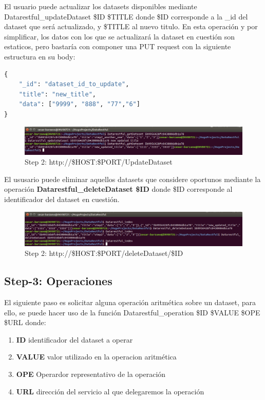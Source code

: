 \documentclass[a4paper,11pt]{book}
\begin{document}
El usuario puede actualizar los datasets disponibles mediante Datarestful\_updateDataset \$ID \$TITLE donde \$ID  corresponde a la \_id del dataset que será actualizado, y \$TITLE al nuevo titulo. En esta operación y por simplificar, los datos con los que se actualizará la dataset en cuestión son estaticos, pero bastaría con componer una PUT request con la siguiente estructura en su body:  

\begin{lstlisting}[language=python,caption={body}]
{
	"_id": "dataset_id_to_update",
    "title": "new_title",
    "data": ["9999", "888", "77","6"]
}

\end{lstlisting}

\begin{figure}[H]  
\centering 
\includegraphics[scale=0.35]{imagenes/update.png}
\caption{ Step 2: http://\$HOST:\$PORT/UpdateDataset }  
\end{figure}


El ususario puede eliminar aquellos datasets que considere oportunos mediante la operación \textbf{Datarestful\_deleteDataset \$ID} donde \$ID corresponde al identificador del dataset en cuestión. 

\begin{figure}[H]  
\centering 
\includegraphics[scale=0.35]{imagenes/delete.png}
\caption{ Step 2: http://\$HOST:\$PORT/deleteDataset/\$ID }  
\end{figure}

\subsection{Step-3: Operaciones}

El siguiente paso es solicitar alguna operación aritmética sobre un dataset, para ello, se puede hacer uso de la función Datarestful\_operation \$ID \$VALUE \$OPE \$URL donde:

\begin{enumerate}
\item \textbf{ID} identificador del dataset a operar 
\item \textbf{VALUE} valor utilizado en la operacion aritmética
\item \textbf{OPE} Operardor representativo de la operación
\item \textbf{URL} dirección del servicio al que delegaremos la operación
\end{enumerate}
\end{document}
